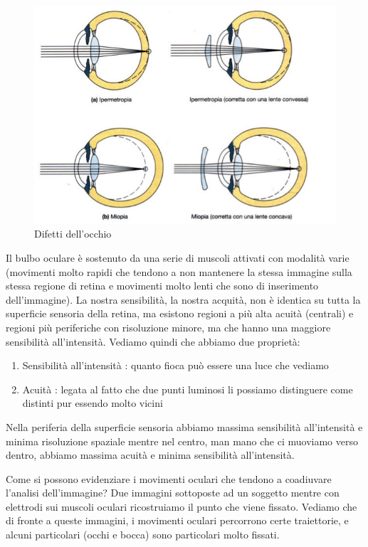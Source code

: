 \documentclass[a4paper,12pt]{article}
\begin{document}
\begin{figure}[H]
\centering
\includegraphics[scale=0.30]{immagine/difetti.jpg}
\caption{Difetti dell'occhio}
\end{figure} 

Il bulbo oculare è sostenuto da una serie di muscoli attivati con modalità varie (movimenti molto rapidi che tendono a non mantenere la stessa immagine sulla stessa regione di retina e movimenti molto lenti che sono di inserimento dell'immagine). La nostra sensibilità, la nostra acquità, non è identica su tutta la superficie sensoria della retina, ma esistono regioni a più alta acuità (centrali) e regioni più periferiche con risoluzione minore, ma che hanno una maggiore sensibilità all'intensità. Vediamo quindi che abbiamo due proprietà:
\begin{enumerate}
\item{Sensibilità all'intensità : quanto fioca può essere una luce che vediamo}
\item{Acuità : legata al fatto che due punti luminosi li possiamo distinguere come distinti pur essendo molto vicini}
\end{enumerate}

Nella periferia della superficie sensoria abbiamo massima sensibilità all'intensità e minima risoluzione spaziale mentre nel centro, man mano che ci muoviamo verso dentro, abbiamo massima acuità e minima sensibilità all'intensità. 

Come si possono evidenziare i movimenti oculari che tendono a coadiuvare l'analisi dell'immagine? Due immagini sottoposte ad un soggetto mentre con elettrodi sui muscoli oculari ricostruiamo il punto che viene fissato. Vediamo che di fronte a queste immagini, i movimenti oculari percorrono certe traiettorie, e alcuni particolari (occhi e bocca) sono particolari molto fissati.
\end{document}

